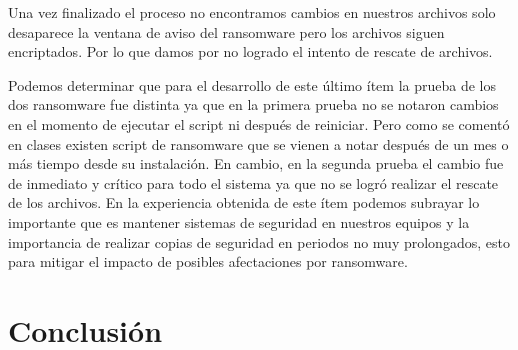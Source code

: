 \documentclass[stu, 11pt, letterpaper, donotrepeattitle, floatsintext, natbib]{apa7}
\begin{document}
Una vez finalizado el proceso no encontramos cambios en nuestros archivos solo desaparece la ventana de aviso del ransomware pero los archivos siguen encriptados. Por lo que damos por no logrado el intento de rescate de archivos.

Podemos determinar que para el desarrollo de este último ítem la prueba de los dos ransomware fue distinta ya que en la primera prueba no se notaron cambios en el momento de ejecutar el script ni después de reiniciar. Pero como se comentó en clases existen script de ransomware que se vienen a notar después de un mes o más tiempo desde su instalación. En cambio, en la segunda prueba el cambio fue de inmediato y crítico para todo el sistema ya que no se logró realizar el rescate de los archivos. En la experiencia obtenida de este ítem podemos subrayar lo importante que es mantener sistemas de seguridad en nuestros equipos y la importancia de realizar copias de seguridad en periodos no muy prolongados, esto para mitigar el impacto de posibles afectaciones por ransomware.


\newpage

\section{\large Conclusión}
\end{document}
